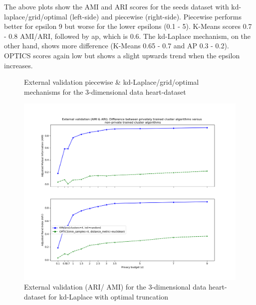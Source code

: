 The above plots show the AMI and ARI scores for the seeds dataset with kd-laplace/grid/optimal (left-side) and piecewise (right-side).
Piecewise performs better for epsilon 9 but worse for the lower epsilons (0.1 - 5).
K-Means scores 0.7 - 0.8 AMI/ARI, followed by \gls{ap}, which is 0.6.
The kd-Laplace mechanism, on the other hand, shows more difference (K-Means 0.65 - 0.7 and AP 0.3 - 0.2).
OPTICS scores again low but shows a slight upwards trend when the epsilon increases.

\begin{figure}[H]
    \caption{External validation piecewise \& kd-Laplace/grid/optimal mechanisms for the 3-dimensional data heart-dataset}
    \centering
    \begin{minipage}[c]{0.60\textwidth}
        \includegraphics[width=1\textwidth]{Results/3d-laplace-optimal-truncated/heart-dataset/ami-and-ari.png}
        \caption{External validation (ARI/ AMI) for the 3-dimensional data heart-dataset for kd-Laplace with optimal truncation}
        \label{fig:external-validation-heart-dataset_comparison_3d-laplace}
    \end{minipage}
    \begin{minipage}[c]{0.60\textwidth}

\end{minipage}
\end{figure}
